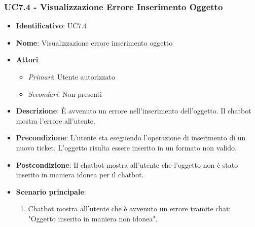 \subsubsection{UC7.4 - Visualizzazione Errore Inserimento Oggetto}
\begin{itemize}
	\item \textbf{Identificativo}: UC7.4
	\item \textbf{Nome}: Visualizzazione errore inserimento oggetto 
	\item \textbf{Attori}
	\begin{itemize} 
		\item \textit{Primari}: Utente autorizzato
		\item \textit{Secondari}: Non presenti
	\end{itemize}
	\item \textbf{Descrizione}: È avvenuto un errore nell'inserimento dell'oggetto. Il chatbot mostra l'errore all'utente.
	\item \textbf{Precondizione}: L'utente sta eseguendo l'operazione di inserimento di un nuovo ticket. L'oggetto risulta essere inserito in un formato non valido. 
	\item \textbf{Postcondizione}: Il chatbot mostra all'utente che l'oggetto non è stato inserito in maniera idonea per il chatbot.
	\item \textbf{Scenario principale}: \begin{enumerate}
		\item Chatbot mostra all'utente che è avvenuto un errore tramite chat: "Oggetto inserito in maniera non idonea".
		\end{enumerate}
\end{itemize}


